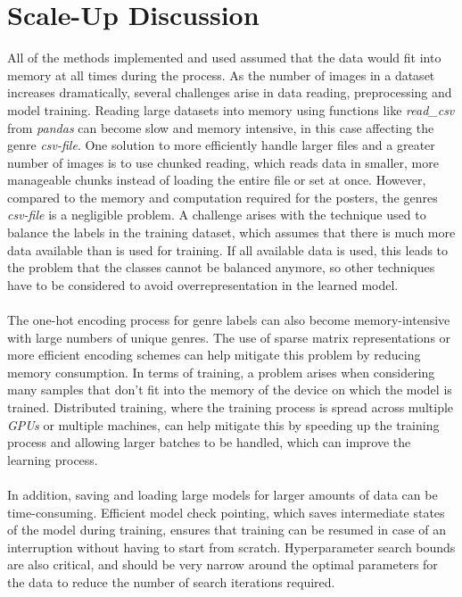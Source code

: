 \documentclass[a4paper, 11pt]{article}
\begin{document}
\section{Scale-Up Discussion}
    All of the methods implemented and used assumed that the data would fit into memory at all times during the process. As the number of images in a dataset increases dramatically, several challenges arise in data reading, preprocessing and model training. Reading large datasets into memory using functions like \textit{read\_csv} from \textit{pandas} can become slow and memory intensive, in this case affecting the genre \textit{csv-file}. One solution to more efficiently handle larger files and a greater number of images is to use chunked reading, which reads data in smaller, more manageable chunks instead of loading the entire file or set at once. However, compared to the memory and computation required for the posters, the genres \textit{csv-file} is a negligible problem. A challenge arises with the technique used to balance the labels in the training dataset, which assumes that there is much more data available than is used for training. If all available data is used, this leads to the problem that the classes cannot be balanced anymore, so other techniques have to be considered to avoid overrepresentation in the learned model.\\\\
    The one-hot encoding process for genre labels can also become memory-intensive with large numbers of unique genres. The use of sparse matrix representations or more efficient encoding schemes can help mitigate this problem by reducing memory consumption. In terms of training, a problem arises when considering many samples that don't fit into the memory of the device on which the model is trained. Distributed training, where the training process is spread across multiple \textit{GPUs} or multiple machines, can help mitigate this by speeding up the training process and allowing larger batches to be handled, which can improve the learning process.\\\\
    In addition, saving and loading large models for larger amounts of data can be time-consuming. Efficient model check pointing, which saves intermediate states of the model during training, ensures that training can be resumed in case of an interruption without having to start from scratch. Hyperparameter search bounds are also critical, and should be very narrow around the optimal parameters for the data to reduce the number of search iterations required.
    
\end{document}
